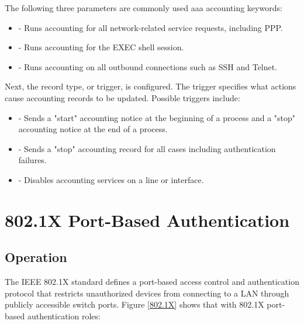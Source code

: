The following three parameters are commonly used aaa accounting keywords:

\begin{itemize}
\item {} - Runs accounting for all network-related service requests, including PPP.
\item {} - Runs accounting for the EXEC shell session.
\item {} - Runs accounting on all outbound connections such as SSH and Telnet.
\end{itemize}

Next, the record type, or trigger, is configured. The trigger specifies what actions cause accounting records to be updated. Possible triggers include:

\begin{itemize}
\item {} - Sends a "start" accounting notice at the beginning of a process and a "stop" accounting notice at the end of a process.
\item {} - Sends a "stop" accounting record for all cases including authentication failures.
\item {} - Disables accounting services on a line or interface.
\end{itemize}
    

\section{802.1X Port-Based Authentication}

\subsection{Operation}

The IEEE 802.1X standard defines a port-based access control and authentication protocol that restricts unauthorized devices from connecting to a LAN through publicly accessible switch ports. Figure \ref{802.1X} shows that with 802.1X port-based authentication roles:

